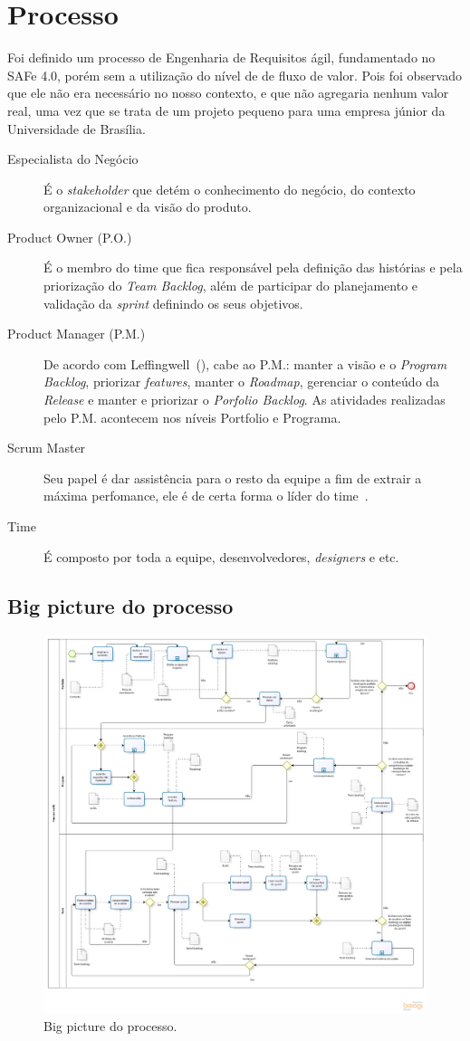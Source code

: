 \chapter{Processo}
Foi definido um processo de Engenharia de Requisitos ágil, fundamentado no SAFe 4.0, porém sem a utilização do nível de de fluxo de valor. Pois foi observado que ele não era necessário no nosso contexto, e que não agregaria nenhum valor real, uma vez que se trata de um projeto pequeno para uma empresa júnior da Universidade de Brasília.

\begin{description}
\item[Especialista do Negócio] É o \textit{stakeholder} que detém o conhecimento do negócio, do contexto organizacional e da visão do produto.    
\item[Product Owner (P.O.)] É o membro do time que fica responsável pela definição das histórias e pela priorização do \textit{Team Backlog}, além de participar do planejamento e validação da \textit{sprint} definindo os seus objetivos.
\item[Product Manager (P.M.)] De acordo com Leffingwell~(\citeyear{leffingwell}), cabe ao P.M.: manter a visão e o \textit{Program Backlog}, priorizar \textit{features}, manter o \textit{Roadmap}, gerenciar o conteúdo da \textit{Release} e manter e priorizar o \textit{Porfolio Backlog}. As atividades realizadas pelo P.M. acontecem nos níveis Portfolio e Programa.
\item[Scrum Master] Seu papel é dar assistência para o resto da equipe a fim de extrair a máxima perfomance, ele é de certa forma o líder do time~\cite{leffingwell}.
\item[Time] É composto por toda a equipe, desenvolvedores, \textit{designers} e etc.
\end{description}

\section{Big picture do processo}
  \begin{figure}[!htbp]
    \centering
    \includegraphics[scale=0.3]{figuras/Processo_v1-2}
    \caption[Big picture do processo.]{Big picture do processo. \footnotemark}
    \label{processoER}
  \end{figure}